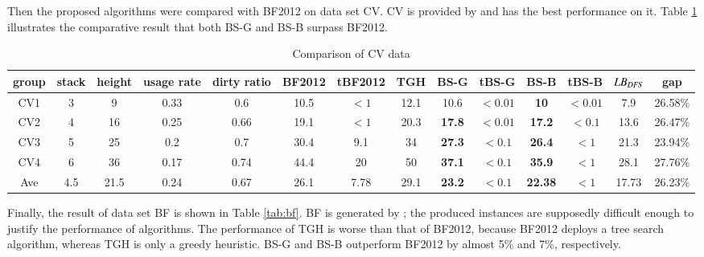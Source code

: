 \documentclass[review,3p,times,authoryear,12pt]{elsarticle}
\begin{document}
Then the proposed algorithms were compared with BF2012 on data set CV. CV is provided by \cite{Caserta2009} and \cite{BF2012} has the best performance on it. Table \ref{tab:cv} illustrates the comparative result that both BS-G and BS-B surpass BF2012.
\begin{table}[htbp]
\scriptsize
  \centering
  \caption{\label{tab:cv} Comparison of CV data}
    \begin{tabular}{c|c|c|c|c|c|c|c|c|c|c|c|c|c}
    \hline
    group & stack & height & usage rate & dirty ratio & BF2012 & tBF2012 & TGH   & BS-G  & tBS-G & BS-B  & tBS-B & $\id{LB}_\id{DFS}$ & gap\\
    \hline
    CV1  & 3  & 9   & 0.33 & 0.6  & 10.5 & $<1$ & 12.1 & 10.6          & $<0.01$ & \textbf{10}   & $<0.01$ &7.9 & 26.58\%\\
    CV2  & 4  & 16  & 0.25 & 0.66 & 19.1 & $<1$ & 20.3 & \textbf{17.8} & $<0.01$ & \textbf{17.2} & $<0.1$ &13.6 & 26.47\%\\
    CV3  & 5  & 25  & 0.2  & 0.7  & 30.4 & 9.1  & 34   & \textbf{27.3} & $<0.1$  & \textbf{26.4} & $<1$   &21.3 & 23.94\%\\
    CV4  & 6  & 36  & 0.17 & 0.74 & 44.4 & 20   & 50   & \textbf{37.1} & $<0.1$  & \textbf{35.9} & $<1$   &28.1 & 27.76\%\\
    \hline
    Ave  & 4.5& 21.5& 0.24 & 0.67 & 26.1 & 7.78 & 29.1 & \textbf{23.2} & $<0.1$  & \textbf{22.38}& $<1$   & 17.73 & 26.23\%\\
    \hline
    \end{tabular}%
\end{table}%

Finally, the result of data set BF is shown in Table \ref{tab:bf}. BF is generated by \cite{BF2012}; the produced instances are supposedly difficult enough to justify the performance of algorithms. The performance of TGH is worse than that of BF2012, because BF2012 deploys a tree search algorithm, whereas TGH is only a greedy heuristic. BS-G and BS-B outperform BF2012 by almost 5\% and 7\%, respectively. 
\end{document}
